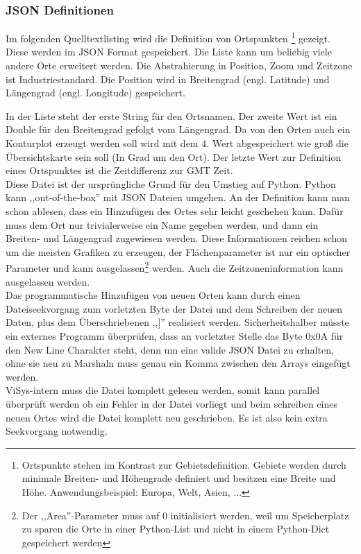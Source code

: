 \subsubsection*{JSON Definitionen}
Im folgenden Quelltextlisting wird die Definition von Ortspunkten
\footnote{Ortspunkte stehen im Kontrast zur Gebietsdefinition.
Gebiete werden durch minimale Breiten- und Höhengrade definiert
und besitzen eine Breite und Höhe. Anwendungsbeispiel: Europa, Welt, Asien, ...}
gezeigt.
Diese werden im JSON Format gespeichert.
Die Liste kann um beliebig viele andere Orte erweitert werden.
Die Abstrahierung in Position, Zoom und Zeitzone ist Industriestandard. Die Position wird in
Breitengrad (engl. Latitude) und Längengrad (engl. Longitude) gespeichert.

In der Liste steht der erste String für den Ortsnamen.
Der zweite Wert ist ein Double für den Breitengrad gefolgt vom Längengrad.
Da von den Orten auch ein Konturplot erzeugt werden soll
wird mit dem 4. Wert abgespeichert wie groß die Übersichtskarte sein soll (In Grad um den Ort).
Der letzte Wert zur Definition eines Ortspunktes ist die Zeitdifferenz zur GMT Zeit.\\
Diese Datei ist der ursprüngliche Grund für den Umstieg auf Python.
Python kann ,,out-of-the-box'' mit JSON Dateien umgehen.
An der Definition kann man schon ablesen,
dass ein Hinzufügen des Ortes sehr leicht geschehen kann.
Dafür muss dem Ort nur trivialerweise ein Name
gegeben werden, und dann ein Breiten- und Längengrad zugewiesen werden.
Diese Informationen reichen
schon um die meisten Grafiken zu erzeugen,
der Flächenparameter ist nur ein optischer Parameter und kann
ausgelassen\footnote{Der ,,Area''-Parameter muss auf 0 initialisiert werden,
weil um Speicherplatz zu sparen die Orte in einer
Python-List und nicht in einem Python-Dict gespeichert werden} werden.
Auch die Zeitzoneninformation kann
ausgelassen werden.\\
Das programmatische Hinzufügen von neuen Orten kann durch einen Dateiseekvorgang zum
vorletzten Byte der Datei und dem Schreiben der neuen Daten, plus dem Überschriebenen ,,]''
realisiert werden. Sicherheitshalber müsste ein externes Programm überprüfen, dass an vorletzter
Stelle das Byte 0x0A für den New Line Charakter steht, denn um eine valide JSON Datei zu erhalten,
ohne sie neu zu Marshaln muss genau ein Komma zwischen den Arrays eingefügt werden. \\
ViSys-intern muss die Datei komplett gelesen werden, somit kann parallel überprüft werden ob
ein Fehler in der Datei vorliegt und beim schreiben eines neuen Ortes wird die Datei komplett neu
geschrieben. Es ist also kein extra Seekvorgang notwendig.

